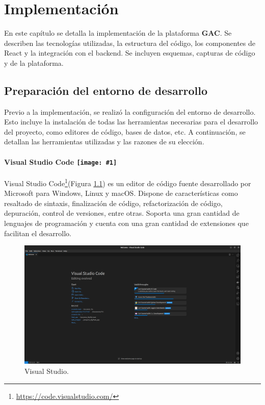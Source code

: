 \chapter{Implementación}

En este capítulo se detalla la implementación de la plataforma \textbf{GAC}. Se describen las tecnologías utilizadas, la estructura del código, los componentes de React y la integración con el backend. Se incluyen esquemas, capturas de código y de la plataforma.

\section{Preparación del entorno de desarrollo}

Previo a la implementación, se realizó la configuración del entorno de desarrollo. Esto incluye la instalación de todas las herramientas necesarias para el desarrollo del proyecto, como editores de código, bases de datos, etc. A continuación, se detallan las herramientas utilizadas y las razones de su elección.

\newpage

\renewcommand{\icon}[1]{\texttt{[image: \#1]}}

\subsubsection*{Visual Studio Code \protect\icon{./imagenes/vscode_logo.png}}

Visual Studio Code\footnote{\url{https://code.visualstudio.com/}}(Figura \ref{fig:vscode}) es un editor de código fuente desarrollado por Microsoft para Windows, Linux y macOS. Dispone de características como resaltado de sintaxis, finalización de código, refactorización de código, depuración, control de versiones, entre otras. Soporta una gran cantidad de lenguajes de programación y cuenta con una gran cantidad de extensiones que facilitan el desarrollo. \newline

\begin{figure}[H]
    \centering
    \includegraphics[width=1\textwidth]{./imagenes/vscode.png}
    \caption{Visual Studio.}
    \label{fig:vscode}
\end{figure}


